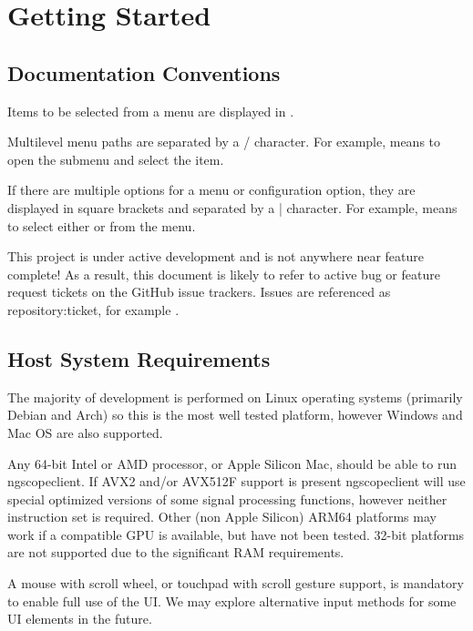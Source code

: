 \chapter{Getting Started}

\section{Documentation Conventions}

Items to be selected from a menu are displayed in .

Multilevel menu paths are separated by a / character. For example,  means to open the
 submenu and select the  item.

If there are multiple options for a menu or configuration option, they are displayed in square brackets and separated
by a | character. For example,  means to select either
 or  from the 
menu.

This project is under active development and is not anywhere near feature complete! As a result, this document is
likely to refer to active bug or feature request tickets on the GitHub issue trackers. Issues are referenced as
repository:ticket, for example .

\section{Host System Requirements}

The majority of development is performed on Linux operating systems (primarily Debian and Arch) so this is the most well
tested platform, however Windows and Mac OS are also supported.

Any 64-bit Intel or AMD processor, or Apple Silicon Mac, should be able to run ngscopeclient. If AVX2 and/or AVX512F
support is present ngscopeclient will use special optimized versions of some signal processing functions, however
neither instruction set is required. Other (non Apple Silicon) ARM64 platforms may work if a compatible GPU is
available, but have not been tested. 32-bit platforms are not supported due to the significant RAM requirements.

A mouse with scroll wheel, or touchpad with scroll gesture support, is mandatory to enable full use of the UI. We may
explore alternative input methods for some UI elements in the future.

